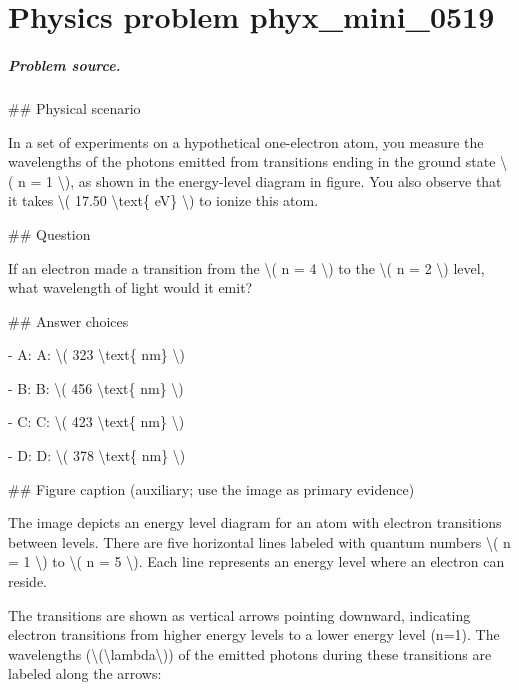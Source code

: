 
\chapter{Physics problem phyx\_mini\_0519}
\label{ch:PhyXMiniProblems_problem_phyx_mini_0519}

\paragraph{Problem source.}
\#\# Physical scenario

In a set of experiments on a hypothetical one-electron atom, you measure the wavelengths of the photons emitted from transitions ending in the ground state \textbackslash{}( n = 1 \textbackslash{}), as shown in the energy-level diagram in figure. You also observe that it takes \textbackslash{}( 17.50 \textbackslash{}text\{ eV\} \textbackslash{}) to ionize this atom.

\#\# Question

If an electron made a transition from the \textbackslash{}( n = 4 \textbackslash{}) to the \textbackslash{}( n = 2 \textbackslash{}) level, what wavelength of light would it emit?

\#\# Answer choices

- A: A: \textbackslash{}( 323 \textbackslash{}text\{ nm\} \textbackslash{})

- B: B: \textbackslash{}( 456 \textbackslash{}text\{ nm\} \textbackslash{})

- C: C: \textbackslash{}( 423 \textbackslash{}text\{ nm\} \textbackslash{})

- D: D: \textbackslash{}( 378 \textbackslash{}text\{ nm\} \textbackslash{})

\#\# Figure caption (auxiliary; use the image as primary evidence)

The image depicts an energy level diagram for an atom with electron transitions between levels. There are five horizontal lines labeled with quantum numbers \textbackslash{}( n = 1 \textbackslash{}) to \textbackslash{}( n = 5 \textbackslash{}). Each line represents an energy level where an electron can reside.

The transitions are shown as vertical arrows pointing downward, indicating electron transitions from higher energy levels to a lower energy level (n=1). The wavelengths (\textbackslash{}(\textbackslash{}lambda\textbackslash{})) of the emitted photons during these transitions are labeled along the arrows:

